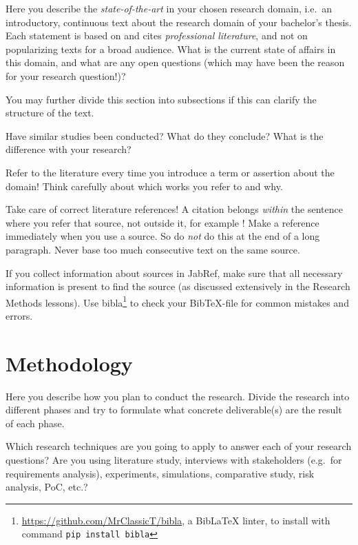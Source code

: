 \documentclass[english]{hogent-article}
\begin{document}

Here you describe the \emph{state-of-the-art} in your chosen research domain, i.e.\ an introductory, continuous text about the research domain of your bachelor's thesis. Each statement is based on and cites \emph{professional literature}, and not on popularizing texts for a broad audience. What is the current state of affairs in this domain, and what are any open questions (which may have been the reason for your research question!)?

You may further divide this section into subsections if this can clarify the structure of the text.

Have similar studies been conducted? What do they conclude? What is the difference with your research?

Refer to the literature every time you introduce a term or assertion about the domain! Think carefully about which works you refer to and why.

Take care of correct literature references! A citation belongs \emph{within} the sentence where you refer that source, not outside it, for example \autocite{Hykes2013}! Make a reference immediately when you use a source. So do \emph{not} do this at the end of a long paragraph. Never base too much consecutive text on the same source.

If you collect information about sources in Jab\-Ref, make sure that all necessary information is present to find the source (as discussed extensively in the Research Methods lessons).  Use bibla\footnote{\url{https://github.com/MrClassicT/bibla}, a {Bib\LaTeX} linter, to install with command \texttt{pip install bibla}} to check your Bib\TeX-file for common mistakes and errors.


\section{Methodology}%
\label{sec:methodology}


Here you describe how you plan to conduct the research. Divide the research into different phases and try to formulate what concrete deliverable(s) are the result of each phase.

Which research techniques are you going to apply to answer each of your research questions? Are you using literature study, interviews with stakeholders (e.g.\ for requirements analysis), experiments, simulations, comparative study, risk analysis, PoC, etc.?
\end{document}
